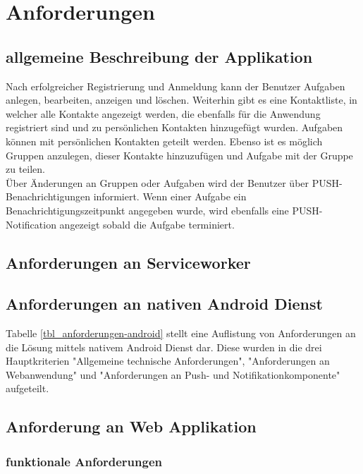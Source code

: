 \chapter{Anforderungen}
\section{allgemeine Beschreibung der Applikation}

Nach erfolgreicher Registrierung und Anmeldung kann der Benutzer Aufgaben anlegen, bearbeiten, anzeigen und löschen. Weiterhin gibt es eine Kontaktliste, in welcher alle Kontakte angezeigt werden, die ebenfalls für die Anwendung registriert sind und zu persönlichen Kontakten hinzugefügt wurden. Aufgaben können mit persönlichen Kontakten geteilt werden. Ebenso ist es möglich Gruppen anzulegen, dieser Kontakte hinzuzufügen und Aufgabe mit der Gruppe zu teilen. \\

Über Änderungen an Gruppen oder Aufgaben wird der Benutzer über PUSH-Benachrichtigungen informiert. Wenn einer Aufgabe ein Benachrichtigungszeitpunkt angegeben wurde, wird ebenfalls eine PUSH-Notification angezeigt sobald die Aufgabe terminiert.


\section{Anforderungen an Serviceworker}

\newpage
\section{Anforderungen an nativen Android Dienst}

Tabelle \ref{tbl_anforderungen-android} stellt eine Auflistung von Anforderungen an die Lösung mittels nativem Android Dienst dar. Diese wurden in die drei Hauptkriterien "Allgemeine technische Anforderungen", "Anforderungen an Webanwendung" und "Anforderungen an Push- und Notifikationkomponente" aufgeteilt.



\section{Anforderung an Web Applikation}
\subsection{funktionale Anforderungen}

